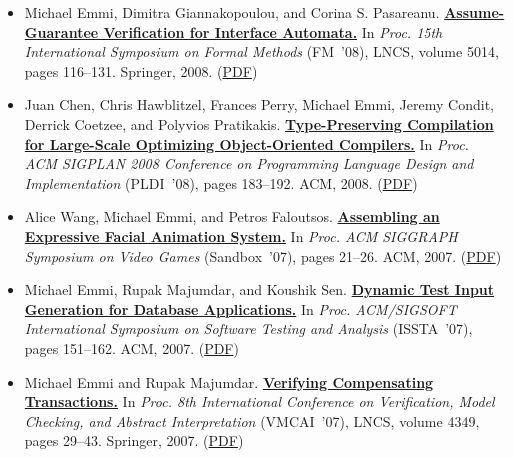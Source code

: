 \documentclass{article}
\begin{document}
\begin{itemize}[leftmargin=0cm,label={}]
    \item Michael Emmi, Dimitra Giannakopoulou, and Corina S. Pasareanu. {\bf\href{%
    http://dx.doi.org/10.1007/978-3-540-68237-0_10}{%
    Assume-Guarantee Verification for Interface Automata.}} In \emph{ Proc. 15th International Symposium on Formal Methods } (FM ’08), LNCS, volume 5014, pages 116–131. Springer, 2008. (\href{https://michael-emmi.github.io/https://github.com/michael-emmi/research-papers/raw/master/conf-fm-EmmiGP08.pdf}{PDF})


    \item Juan Chen, Chris Hawblitzel, Frances Perry, Michael Emmi, Jeremy Condit, Derrick Coetzee, and Polyvios Pratikakis. {\bf\href{%
    http://doi.acm.org/10.1145/1375581.1375604}{%
    Type-Preserving Compilation for Large-Scale Optimizing Object-Oriented Compilers.}} In \emph{ Proc. ACM SIGPLAN 2008 Conference on Programming Language Design and Implementation } (PLDI ’08), pages 183–192. ACM, 2008. (\href{https://michael-emmi.github.io/https://github.com/michael-emmi/research-papers/raw/master/conf-pldi-ChenHPECCP08.pdf}{PDF})


    \item Alice Wang, Michael Emmi, and Petros Faloutsos. {\bf\href{%
    http://doi.acm.org/10.1145/1274940.1274947}{%
    Assembling an Expressive Facial Animation System.}} In \emph{ Proc. ACM SIGGRAPH Symposium on Video Games } (Sandbox ’07), pages 21–26. ACM, 2007. (\href{https://michael-emmi.github.io/https://github.com/michael-emmi/research-papers/raw/master/conf-sandbox-WangEF07.pdf}{PDF})


    \item Michael Emmi, Rupak Majumdar, and Koushik Sen. {\bf\href{%
    http://doi.acm.org/10.1145/1273463.1273484}{%
    Dynamic Test Input Generation for Database Applications.}} In \emph{ Proc. ACM/SIGSOFT International Symposium on Software Testing and Analysis } (ISSTA ’07), pages 151–162. ACM, 2007. (\href{https://michael-emmi.github.io/https://github.com/michael-emmi/research-papers/raw/master/conf-issta-EmmiMS07.pdf}{PDF})


    \item Michael Emmi and Rupak Majumdar. {\bf\href{%
    http://dx.doi.org/10.1007/978-3-540-69738-1_2}{%
    Verifying Compensating Transactions.}} In \emph{ Proc. 8th International Conference on Verification, Model Checking, and Abstract Interpretation } (VMCAI ’07), LNCS, volume 4349, pages 29–43. Springer, 2007. (\href{https://michael-emmi.github.io/https://github.com/michael-emmi/research-papers/raw/master/conf-vmcai-EmmiM07.pdf}{PDF})



\end{itemize}
\end{document}
